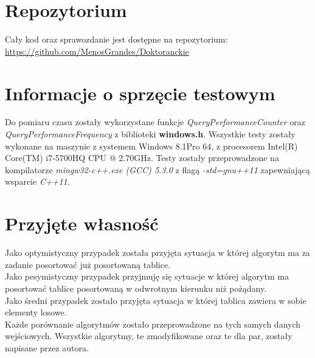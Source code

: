 
 \tableofcontents 
 \section{Repozytorium}
 Cały kod oraz sprawozdanie jest dostępne na repozytorium:
 \url{https://github.com/MenosGrandes/Doktoranckie}
\section{Informacje o sprzęcie testowym}
Do pomiaru czasu zostały wykorzystane funkcje \textit{QueryPerformanceCounter} oraz \textit{QueryPerformanceFrequency} z biblioteki \textbf{windows.h}. Wszystkie testy zostały wykonane na maszynie z systemem Windows 8.1Pro 64, z procesorem Intel(R) Core(TM) i7-5700HQ CPU @ 2.70GHz. Testy zostały przeprowadzone na kompilatorze \textit{mingw32-c++.exe (GCC) 5.3.0} z flagą \textit{-std=gnu++11} zapewniającą wsparcie \textit{C++11}.
\section{Przyjęte własność}
Jako optymistyczny przypadek została przyjęta sytuacja w której algorytm ma za zadanie posortować już posortowaną tablice.\\
Jako pesymistyczny przypadek przyjmuję się sytuacje w której algorytm ma posortować tablice posortowaną w odwrotnym kierunku niż pożądany.\\
Jako średni przypadek zostało przyjęta sytuacja w której tablica zawiera w sobie elementy losowe.\\
 Każde porównanie algorytmów zostało przeprowadzone na tych samych danych wejściowych. Wszystkie algorytmy, te zmodyfikowane oraz te dla par, zostały napisane przez autora.
